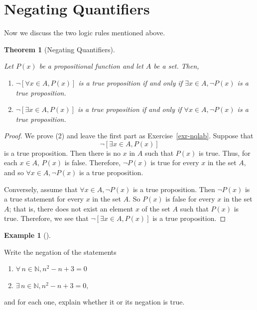 \documentclass[
  letterpaper,
  10pt,
  reqno,
  twopage,
  openany]{book}
\providecommand{\tightlist}{%
  \setlength{\itemsep}{0pt}\setlength{\parskip}{0pt}}\usepackage{longtable,booktabs,array}
\theoremstyle{plain}
\theoremstyle{definition}
\theoremstyle{definition}
\theoremstyle{definition}
\newtheorem{example}{Example}[chapter]
\theoremstyle{plain}
\theoremstyle{plain}
\newtheorem{theorem}{Theorem}[chapter]
\theoremstyle{remark}
\begin{document}
\hypertarget{negating-quantifiers}{%
\section{Negating Quantifiers}\label{negating-quantifiers}}

Now we discuss the two logic rules mentioned above.

\leavevmode{}%
\begin{theorem}[Negating Quantifiers]\label{thm-thmnqlab}

Let \(P(x)\) be a propositional function and let \(A\) be a set. Then,

\begin{enumerate}
\def\labelenumi{\arabic{enumi}.}
\tightlist
\item
  \(\neg [\forall x\in A, P(x)]\) is a true proposition if and only if
  \(\exists x\in A, \neg P(x)\) is a true proposition.
\item
  \(\neg [\exists x\in A, P(x)]\) is a true proposition if and only if
  \(\forall x\in A, \neg P(x)\) is a true proposition.
\end{enumerate}

\end{theorem}

\begin{proof}

We prove (2) and leave the first part as Exercise~\ref{exr-nqlab}.
Suppose that \[\neg [\exists x\in A, P(x)]\] is a true proposition. Then
there is no \(x\) in \(A\) such that \(P(x)\) is true. Thus, for each
\(x\in A\), \(P(x)\) is false. Therefore, \(\neg P(x)\) is true for
every \(x\) in the set \(A\), and so \(\forall x\in A, \neg P(x)\) is a
true proposition.

Conversely, assume that \(\forall x\in A, \neg P(x)\) is a true
proposition. Then \(\neg P(x)\) is a true statement for every \(x\) in
the set \(A\). So \(P(x)\) is false for every \(x\) in the set \(A\);
that is, there does not exist an element \(x\) of the set \(A\) such
that \(P(x)\) is true. Therefore, we see that
\(\neg [\exists x\in A, P(x)]\) is a true proposition.

\end{proof}

\leavevmode{}%
\begin{example}[]\label{exm-nq-1}

Write the negation of the statements

\begin{enumerate}
\def\labelenumi{\arabic{enumi}.}
\tightlist
\item
  \(\forall \, n\in \mathbb{N}, n^2-n+3=0\)
\item
  \(\exists \, n\in \mathbb{N}, n^2-n+3=0,\)
\end{enumerate}

and for each one, explain whether it or its negation is true.

\end{example}
\end{document}

